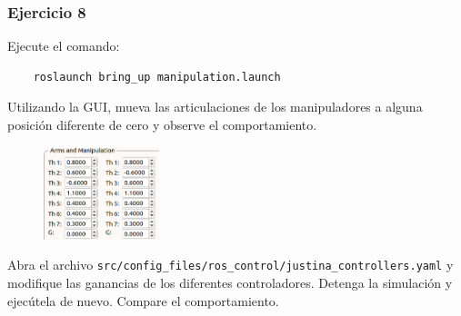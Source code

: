 \begin{frame}[containsverbatim]\frametitle{Ejercicio 8}
  Ejecute el comando:
  \begin{lstlisting}
    roslaunch bring_up manipulation.launch
  \end{lstlisting}
  Utilizando la GUI, mueva las articulaciones de los manipuladores a alguna posición diferente de cero y observe el comportamiento.
  \begin{figure}
    \centering
    \includegraphics[width=0.3\textwidth]{Figures/Exercise8Gui.png}
  \end{figure}
  Abra el archivo \texttt{src/config\_files/ros\_control/justina\_controllers.yaml} y modifique las ganancias de los diferentes controladores. Detenga la simulación y ejecútela de nuevo. Compare el comportamiento. 
\end{frame}
